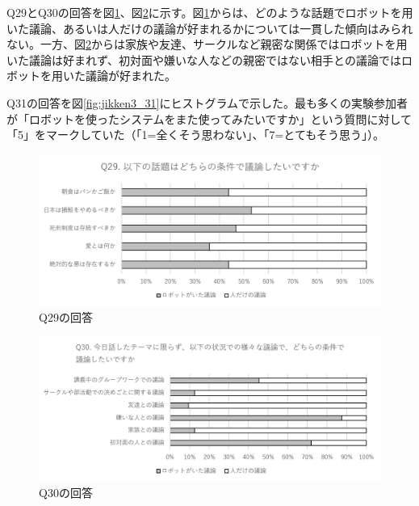 \documentclass[11pt, a4paper]{jreport} %
\begin{document}
Q29とQ30の回答を図\ref{fig:jikken3_29}、図\ref{fig:jikken3_30}に示す。図\ref{fig:jikken3_29}からは、どのような話題でロボットを用いた議論、あるいは人だけの議論が好まれるかについては一貫した傾向はみられない。一方、図\ref{fig:jikken3_30}からは家族や友達、サークルなど親密な関係ではロボットを用いた議論は好まれず、初対面や嫌いな人などの親密ではない相手との議論ではロボットを用いた議論が好まれた。


Q31の回答を図\ref{fig:jikken3_31}にヒストグラムで示した。最も多くの実験参加者が「ロボットを使ったシステムをまた使ってみたいですか」という質問に対して「5」をマークしていた（「1=全くそう思わない」、「7=とてもそう思う」）。

\begin{figure}[htbp]
\begin{center}
\includegraphics[width=150mm]{images/jikken3_29.png}
\caption{Q29の回答}
\label{fig:jikken3_29}
\end{center}
\end{figure}

\begin{figure}[htbp]
\begin{center}
\includegraphics[width=150mm]{images/jikken3_30.png}
\caption{Q30の回答}
\label{fig:jikken3_30}
\end{center}
\end{figure}
\end{document}
